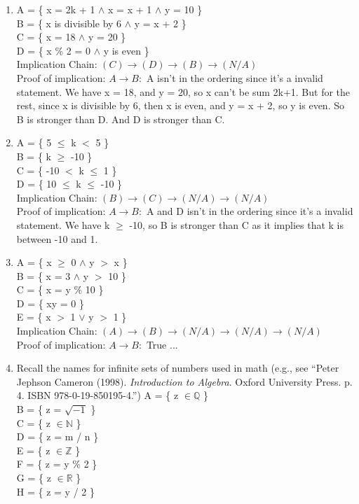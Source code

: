 \documentclass[11pt]{article}
\begin{document}
\begin{enumerate}

\item A = \{ x = 2k + 1 $\land$ x = x + 1 $\land$ y = 10 \}\\
B = \{ x is divisible by 6 $\land$ y = x + 2 \} \\
C = \{ x = 18 $\land$ y = 20 \} \\
D = \{ x \% 2 = 0 $\land$ y is even \} \\

Implication Chain: $(C) \rightarrow (D) \rightarrow (B) \rightarrow (N/A)$ \\
Proof of implication: $A \rightarrow B:$ A isn't in the ordering since it's a invalid statement. We have x = 18, and y = 20, so x can't be sum 2k+1. But for the rest,
since x is divisible by 6, then x is even, and y = x + 2, so y is even. So B is stronger than D. And D is stronger than C.
\item A = \{ 5 $\le$ k $<$ 5 \}\\
B = \{ k $\ge$ -10 \} \\
C = \{ -10 $<$ k $\le$ 1 \} \\
D = \{ 10 $\le$ k $\le$ -10 \}\\

Implication Chain: $(B) \rightarrow (C) \rightarrow (N/A) \rightarrow (N/A)$ \\
Proof of implication: $A \rightarrow B:$ A and D isn't in the ordering since it's a invalid statement. We have k $\ge$ -10, so B is stronger than C as it implies that k is between -10 and 1.

\item A = \{ x $\ge$ 0 $\land$ y $>$ x \} \\
B = \{ x = 3 $\land$ y $>$ 10 \} \\
C = \{ x = y \% 10 \} \\
D = \{ xy = 0 \} \\
E = \{ x $>$ 1 $\lor$ y $>$ 1 \} \\

Implication Chain: $(A) \rightarrow (B) \rightarrow (N/A) \rightarrow (N/A) \rightarrow (N/A)$ \\
Proof of implication: $A \rightarrow B:$ True %
...
\newpage
\item Recall the names for infinite sets of numbers used in math (e.g., see ``Peter Jephson Cameron (1998). \textit{Introduction to Algebra}. Oxford University Press. p. 4. ISBN 978-0-19-850195-4.'')
A = \{ z $\in \mathbb{Q}$ \} \\
B = \{ z = $\sqrt{-1}$ \} \\
C = \{ z $\in \mathbb{N}$ \} \\
D = \{ z = m / n \} \\
E = \{ z $\in \mathbb{Z}$ \} \\
F = \{ z = y \% 2 \} \\
G = \{ z $\in \mathbb{R}$ \} \\
H = \{ z = y / 2 \} \\


\end{enumerate}
\end{document}

